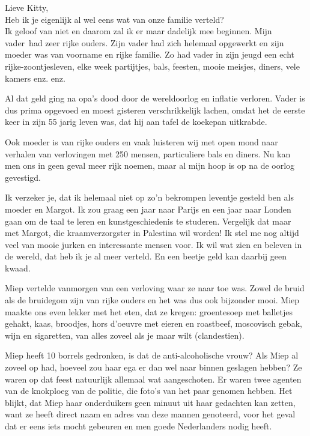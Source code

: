 \documentclass{book}
\begin{document}
Lieve Kitty,\\
Heb ik je eigenlijk al wel eens wat van onze familie verteld?\\
Ik geloof van niet en daarom zal ik er maar dadelijk mee beginnen. Mijn
vader~had zeer rijke ouders. Zijn vader had zich helemaal opgewerkt en zijn
moeder was van voorname en rijke familie. Zo had vader in zijn jeugd een echt
rijke-zoontjesleven, elke week partijtjes, bals, feesten, mooie meisjes, diners,
vele kamers enz. enz.

Al dat geld ging na opa's dood door de wereldoorlog en inflatie verloren.  Vader
is dus prima opgevoed en moest gisteren verschrikkelijk lachen, omdat het de
eerste keer in zijn 55 jarig leven was, dat hij aan tafel de koekepan uitkrabde.

Ook moeder is van rijke ouders en vaak luisteren wij met open mond naar verhalen
van verlovingen met 250 mensen, particuliere bals en diners. Nu kan men ons in
geen geval meer rijk noemen, maar al mijn hoop is op na de oorlog gevestigd.

Ik verzeker je, dat ik helemaal niet op zo'n bekrompen leventje gesteld ben als
moeder en Margot. Ik zou graag een jaar naar Parijs en een jaar naar Londen gaan
om de taal te leren en kunstgeschiedenis te studeren.  Vergelijk dat maar met
Margot, die kraamverzorgster in Palestina wil worden! Ik stel me nog altijd veel
van mooie jurken en interessante mensen voor. Ik wil wat zien en beleven in de
wereld, dat heb ik je al meer verteld. En een beetje geld kan daarbij geen
kwaad.

Miep vertelde vanmorgen van een verloving waar ze naar toe was. Zowel de bruid
als de bruidegom zijn van rijke ouders en het was dus ook bijzonder mooi. Miep
maakte ons even lekker met het eten, dat ze kregen: groentesoep met balletjes
gehakt, kaas, broodjes, hors d'oeuvre met eieren en roastbeef, moscovisch gebak,
wijn en sigaretten, van alles zoveel als je maar wilt (clandestien).

Miep heeft 10 borrels gedronken, is dat de anti-alcoholische vrouw? Als Miep al
zoveel op had, hoeveel zou haar ega er dan wel naar binnen geslagen hebben? Ze
waren op dat feest natuurlijk allemaal wat aangeschoten. Er waren twee agenten
van de knokploeg van de politie, die foto's van het paar genomen hebben. Het
blijkt, dat Miep haar onderduikers geen minuut uit haar gedachten kan zetten,
want ze heeft direct naam en adres van deze mannen genoteerd, voor het geval dat
er eens iets mocht gebeuren en men goede Nederlanders nodig heeft.
\end{document}

